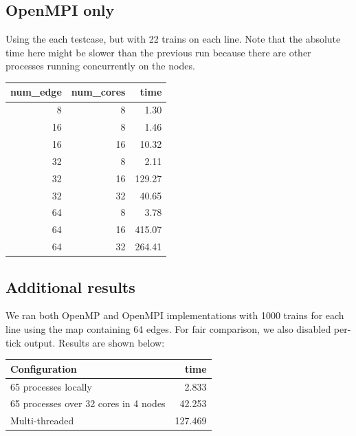 \documentclass[a4paper,12pt]{article}
\begin{document}
\subsection{OpenMPI only}
Using the each testcase, but with 22 trains on each line. Note that the absolute time here might be slower than the previous run because there are other processes running concurrently on the nodes.
\begin{center}
	\begin{tabular}{r r | r}
		num\_edge & num\_cores & time   \\
		\hline
		8         & 8          & 1.30   \\
		\hline
		16        & 8          & 1.46   \\
		16        & 16         & 10.32  \\
		\hline
		32        & 8          & 2.11   \\
		32        & 16         & 129.27 \\
		32        & 32         & 40.65  \\
		\hline
		64        & 8          & 3.78   \\
		64        & 16         & 415.07 \\
		64        & 32         & 264.41 \\
	\end{tabular}
  \label{table:openmpi}
\end{center}

\subsection{Additional results}
We ran both OpenMP and OpenMPI implementations with 1000 trains for each line using the map containing 64 edges. For fair comparison, we also disabled per-tick output. Results are shown below:

\begin{center}
	\begin{tabular}{l | r}
		Configuration                        & time    \\ \hline
		65 processes locally                 & 2.833   \\
		65 processes over 32 cores in 4 nodes & 42.253  \\
		Multi-threaded                        & 127.469 \\
	\end{tabular}
	\label{table:additional}
\end{center}
\end{document}
